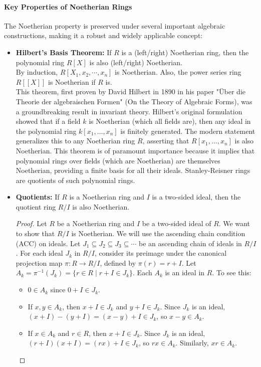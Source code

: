 \documentclass[12pt]{article}
\theoremstyle{definition}
\numberwithin{equation}{subsection}
\begin{document}
\paragraph{Key Properties of Noetherian Rings}
The Noetherian property is preserved under several important algebraic constructions, making it a robust and widely applicable concept:
\begin{itemize}
\item \textbf{Hilbert's Basis Theorem:} If $R$ is a (left/right) Noetherian ring, then the polynomial ring $R[X]$ is also (left/right) Noetherian.\\
By induction, $R[X_1, x_2, \cdots, x_n]$ is Noetherian. Also, the power series ring $R[[X]]$ is Noetherian if $R$ is.\\
This theorem, first proven by David Hilbert in 1890 in his paper "Über die Theorie der algebraischen Formen" (On the Theory of Algebraic Forms), was a groundbreaking result in invariant theory. Hilbert's original formulation showed that if a field $k$ is Noetherian (which all fields are), then any ideal in the polynomial ring $k[x_1, \ldots, x_n]$ is finitely generated. The modern statement generalizes this to any Noetherian ring $R$, asserting that $R[x_1, \ldots, x_n]$ is also Noetherian. This theorem is of paramount importance because it implies that polynomial rings over fields (which are Noetherian) are themselves Noetherian, providing a finite basis for all their ideals. Stanley-Reisner rings are quotients of such polynomial rings.
\item \textbf{Quotients:} If $R$ is a Noetherian ring and $I$ is a two-sided ideal, then the quotient ring $R/I$ is also Noetherian.
\begin{proof}
Let $R$ be a Noetherian ring and $I$ be a two-sided ideal of $R$. We want to show that $R/I$ is Noetherian. We will use the ascending chain condition (ACC) on ideals.
Let $J_1 \subseteq J_2 \subseteq J_3 \subseteq \cdots$ be an ascending chain of ideals in $R/I$.
For each ideal $J_k$ in $R/I$, consider its preimage under the canonical projection map $\pi: R \to R/I$, defined by $\pi(r) = r+I$. Let $A_k = \pi^{-1}(J_k) = \{r \in R \mid r+I \in J_k\}$.
Each $A_k$ is an ideal in $R$. To see this:
\begin{itemize}
    \item $0 \in A_k$ since $0+I \in J_k$.
    \item If $x, y \in A_k$, then $x+I \in J_k$ and $y+I \in J_k$. Since $J_k$ is an ideal, $(x+I)-(y+I) = (x-y)+I \in J_k$, so $x-y \in A_k$.
    \item If $x \in A_k$ and $r \in R$, then $x+I \in J_k$. Since $J_k$ is an ideal, $(r+I)(x+I) = (rx)+I \in J_k$, so $rx \in A_k$. Similarly, $xr \in A_k$.

\end{itemize}
\end{proof}
\end{itemize}
\end{document}
